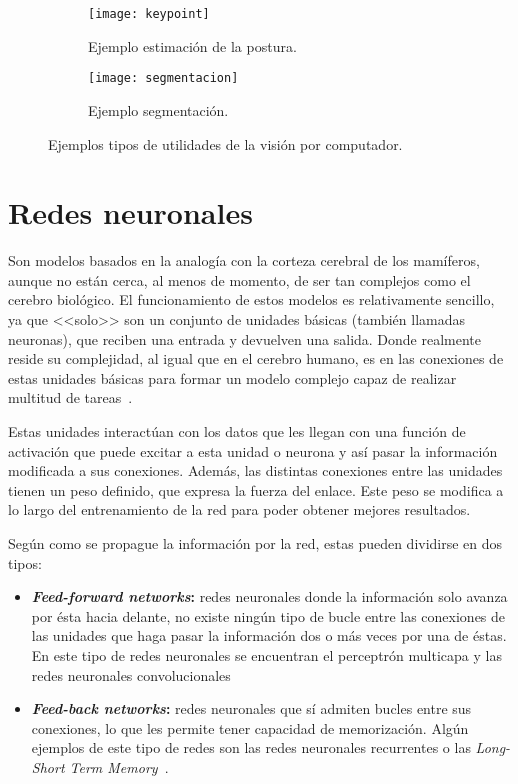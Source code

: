 \begin{figure}[ht]
	\begin{subfigure}{.5\textwidth}
		\centering
		\texttt{[image: keypoint]}  
		\caption{Ejemplo estimación de la postura.}
		\label{fig:keypoint}
	\end{subfigure}
	\begin{subfigure}{.5\textwidth}
		\centering
		\texttt{[image: segmentacion]}  
		\caption{Ejemplo segmentación.}
		\label{fig:segmentation}
	\end{subfigure}
	\caption{Ejemplos tipos de utilidades de la visión por computador.}
	\label{fig:vc}
\end{figure}

\section{Redes neuronales}
Son modelos basados en la analogía con la corteza cerebral de los mamíferos, aunque no están cerca, al menos de momento, de ser tan complejos como el cerebro biológico. El funcionamiento de estos modelos es relativamente sencillo, ya que <<solo>> son un conjunto de unidades básicas (también llamadas neuronas), que reciben una entrada y devuelven una salida. Donde realmente reside su complejidad, al igual que en el cerebro humano, es en las conexiones de estas unidades básicas para formar un modelo complejo capaz de realizar multitud de tareas~\cite{cnn}.

Estas unidades interactúan con los datos que les llegan con una función de activación que puede excitar a esta unidad o neurona y así pasar la información modificada a sus conexiones. Además, las distintas conexiones entre las unidades tienen un peso definido, que expresa la fuerza del enlace. Este peso se modifica a lo largo del entrenamiento de la red para poder obtener mejores resultados.

Según como se propague la información por la red, estas pueden dividirse en dos tipos:
\begin{itemize}
	\item \textbf{\textit{Feed-forward networks}:} redes neuronales donde la información solo avanza por ésta hacia delante, no existe ningún tipo de bucle entre las conexiones de las unidades que haga pasar la información dos o más veces por una de éstas. En este tipo de redes neuronales se encuentran el perceptrón multicapa y las redes neuronales convolucionales
	\item \textbf{\textit{Feed-back networks}:} redes neuronales que sí admiten bucles entre sus conexiones, lo que les permite tener capacidad de memorización. Algún ejemplos de este tipo de redes son las redes neuronales recurrentes o las \textit{Long-Short Term Memory}~\cite{lstm}.
\end{itemize}
